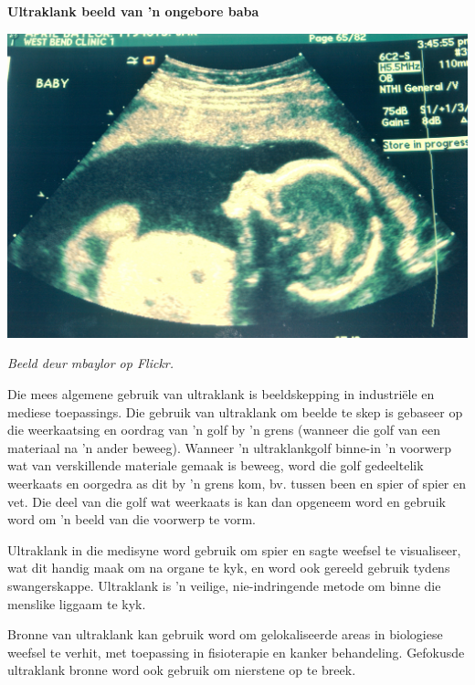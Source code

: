 \begin{minipage}{.5\textwidth}
\begin{center}
\textbf{Ultraklank beeld van 'n ongebore baba}\par
\includegraphics[width=.8\columnwidth]{../Grade10/photos/ultrasound_mbaylor_flickr.jpg}
\par\textit{Beeld deur mbaylor op Flickr.}
\end{center}
\end{minipage}
\begin{minipage}{.5\textwidth}

Die mees algemene gebruik van ultraklank is beeldskepping in industri\"ele en mediese toepassings. Die gebruik van ultraklank om beelde te skep is gebaseer op die weerkaatsing en oordrag van 'n golf by 'n grens (wanneer die golf van een materiaal na 'n ander beweeg). Wanneer 'n ultraklankgolf binne-in 'n voorwerp wat van verskillende materiale gemaak is beweeg, word die golf gedeeltelik weerkaats en oorgedra as dit by 'n grens kom, bv. tussen been en spier of spier en vet. Die deel van die golf wat weerkaats is kan dan opgeneem word en gebruik word om 'n beeld van die voorwerp te vorm. \par

Ultraklank in die medisyne word gebruik om spier en sagte weefsel te visualiseer, wat dit handig maak om na organe te kyk, en word ook gereeld gebruik tydens swangerskappe. Ultraklank is 'n veilige, nie-indringende metode om binne die menslike liggaam te kyk. \par
      
\end{minipage}

Bronne van ultraklank kan gebruik word om gelokaliseerde areas in biologiese weefsel te verhit, met toepassing in fisioterapie en kanker behandeling. Gefokusde ultraklank bronne word ook gebruik om nierstene op te breek.\par

